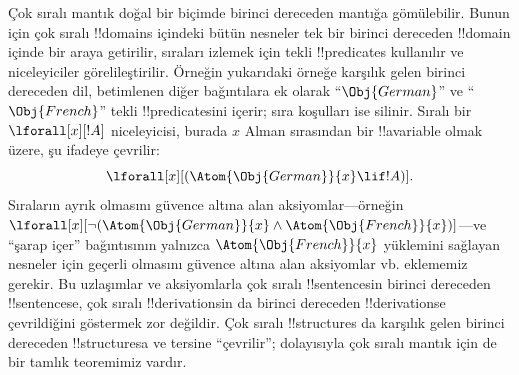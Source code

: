 Çok sıralı mantık doğal bir biçimde birinci dereceden mantığa gömülebilir.
Bunun için çok sıralı !!{domain}s içindeki bütün nesneler tek bir birinci
dereceden !!{domain} içinde bir araya getirilir, sıraları izlemek için tekli
!!{predicate}s kullanılır ve niceleyiciler görelileştirilir. Örneğin yukarıdaki
örneğe karşılık gelen birinci dereceden dil, betimlenen diğer bağıntılara ek
olarak ``$\Obj{German}$'' ve ``$\Obj{French}$'' tekli !!{predicate}s{}ini içerir;
sıra koşulları ise silinir. Sıralı bir $\lforall[x][!A]$ niceleyicisi, burada
$x$ Alman sırasından bir !!a{variable} olmak üzere, şu ifadeye çevrilir:
\[
\lforall[x][(\Atom{\Obj{German}}{x} \lif !A)].
\]
Sıraların ayrık olmasını güvence altına alan aksiyomlar---örneğin
$\lforall[x][\lnot (\Atom{\Obj{German}}{x} \land
  \Atom{\Obj{French}}{x})]$---ve ``şarap içer'' bağıntısının yalnızca
$\Atom{\Obj{French}}{x}$ yüklemini sağlayan nesneler için geçerli olmasını
güvence altına alan aksiyomlar vb. eklememiz gerekir. Bu uzlaşımlar ve
aksiyomlarla çok sıralı !!{sentence}s{}in birinci dereceden !!{sentence}s{}e,
çok sıralı !!{derivation}s{}in da birinci dereceden !!{derivation}s{}e çevrildiğini
göstermek zor değildir. Çok sıralı !!{structure}s da karşılık gelen birinci
dereceden !!{structure}s{}a ve tersine ``çevrilir''; dolayısıyla çok sıralı
mantık için de bir tamlık teoremimiz vardır.

